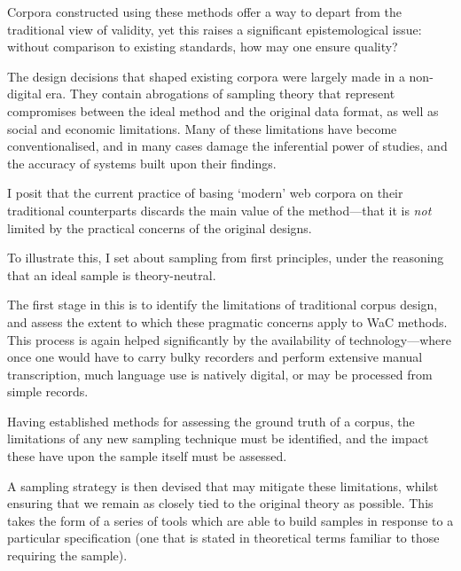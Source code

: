 Corpora constructed using these methods offer a way to depart from the traditional view of validity, yet this raises a significant epistemological issue: without comparison to existing standards, how may one ensure quality?


The design decisions that shaped existing corpora were largely made in a non-digital era.  They contain abrogations of sampling theory that represent compromises between the ideal method and the original data format, as well as social and economic limitations.  Many of these limitations have become conventionalised, and in many cases damage the inferential power of studies, and the accuracy of systems built upon their findings.


I posit that the current practice of basing `modern' web corpora on their traditional counterparts discards the main value of the method---that it is \textit{not} limited by the practical concerns of the original designs.


To illustrate this, I set about sampling from first principles, under the reasoning that an ideal sample is theory-neutral. 


The first stage in this is to identify the limitations of traditional corpus design, and assess the extent to which these pragmatic concerns apply to WaC methods.  This process is again helped significantly by the availability of technology---where once one would have to carry bulky recorders and perform extensive manual transcription, much language use is natively digital, or may be processed from simple records.


Having established methods for assessing the ground truth of a corpus, the limitations of any new sampling technique must be identified, and the impact these have upon the sample itself must be assessed.


A sampling strategy is then devised that may mitigate these limitations, whilst ensuring that we remain as closely tied to the original theory as possible.  This takes the form of a series of tools which are able to build samples in response to a particular specification (one that is stated in theoretical terms familiar to those requiring the sample).


